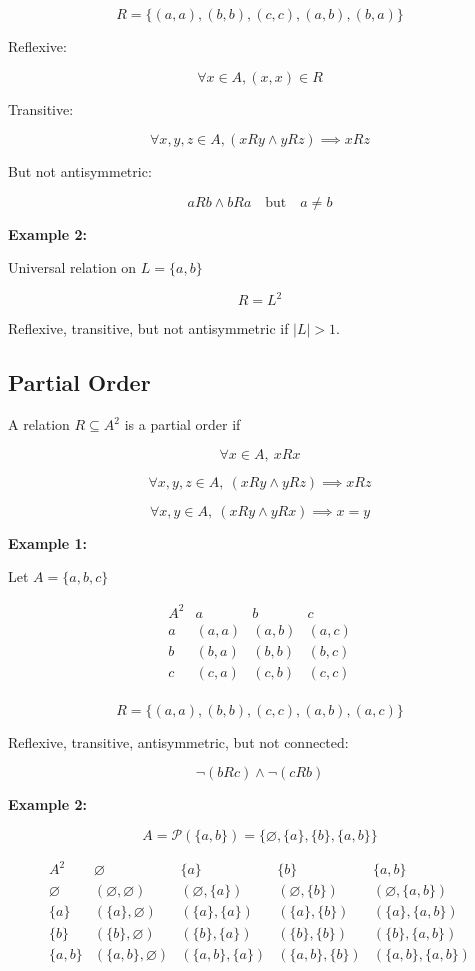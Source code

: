\documentclass[12pt,a4paper,openany]{article}
\begin{document}
$$
R = \{(a,a),(b,b),(c,c),(a,b),(b,a)\}
$$

Reflexive:

$$
\forall x \in A, (x,x) \in R
$$

Transitive:

$$
\forall x,y,z \in A, (xRy \land yRz) \implies xRz
$$

But not antisymmetric:

$$
aRb \land bRa \quad \text{but} \quad a \neq b
$$

\textbf{Example 2:}

Universal relation on $L = \{a,b\}$

$$
R = L^2
$$

Reflexive, transitive, but not antisymmetric if $|L|>1$.

\subsection{Partial Order}

A relation $R \subseteq A^2$ is a partial order if

$$\forall x \in A, \ xRx$$

$$\forall x,y,z \in A, \ (xRy \land yRz) \implies xRz$$

$$\forall x,y \in A, \ (xRy \land yRx) \implies x=y$$

\textbf{Example 1:}

Let $A = \{a,b,c\}$

$$
\begin{array}{c|ccc}
A^2 & a & b & c \\
\hline
a & (a,a) & (a,b) & (a,c) \\
b & (b,a) & (b,b) & (b,c) \\
c & (c,a) & (c,b) & (c,c) \\
\end{array}
$$

$$
R = \{(a,a),(b,b),(c,c),(a,b),(a,c)\}
$$

Reflexive, transitive, antisymmetric, but not connected:

$$
\neg(bRc) \land \neg(cRb)
$$

\textbf{Example 2:}

$$
A = \mathcal{P}(\{a,b\}) = \{\varnothing,\{a\},\{b\},\{a,b\}\}
$$

$$
\begin{array}{c|cccc}
A^2 & \varnothing & \{a\} & \{b\} & \{a,b\} \\
\hline
\varnothing & (\varnothing,\varnothing) & (\varnothing,\{a\}) & (\varnothing,\{b\}) & (\varnothing,\{a,b\}) \\
\{a\} & (\{a\},\varnothing) & (\{a\},\{a\}) & (\{a\},\{b\}) & (\{a\},\{a,b\}) \\
\{b\} & (\{b\},\varnothing) & (\{b\},\{a\}) & (\{b\},\{b\}) & (\{b\},\{a,b\}) \\
\{a,b\} & (\{a,b\},\varnothing) & (\{a,b\},\{a\}) & (\{a,b\},\{b\}) & (\{a,b\},\{a,b\}) \\
\end{array}
$$
\end{document}
